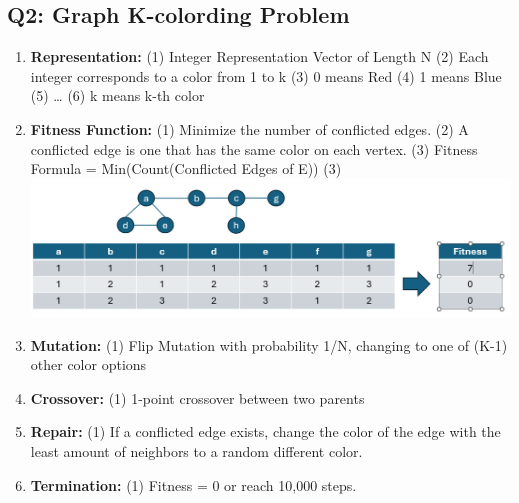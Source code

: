 \documentclass{article}
\begin{document}
\subsection*{Q2: Graph K-colording Problem}
\begin{enumerate}[label=(\alph*)]
    \item \textbf{Representation:}
    \subitem (1) Integer Representation Vector of Length N
    \subitem (2) Each integer corresponds to a color from 1 to k
    \subitem (3) 0 means Red
    \subitem (4) 1 means Blue
    \subitem (5) \dots
    \subitem (6) k means k-th color

    \item \textbf{Fitness Function:}
    \subitem (1) Minimize the number of conflicted edges. 
    \subitem (2) A conflicted edge is one that has the same color on each vertex.
    \subitem (3) Fitness Formula = Min(Count(Conflicted Edges of E))
    \subitem (3) \includegraphics[width=.75\textwidth]{fitness_problem2.PNG}

    \item \textbf{Mutation:}
    \subitem (1) Flip Mutation with probability 1/N, changing to one of (K-1) other color options

    \item \textbf{Crossover:}
    \subitem (1) 1-point crossover between two parents

    \item \textbf{Repair:}
    \subitem (1) If a conflicted edge exists, change the color of the edge with the least amount of neighbors to a random different color.    

    \item \textbf{Termination:}
    \subitem (1) Fitness = 0 or reach 10,000 steps.
\end{enumerate}

\end{document}
